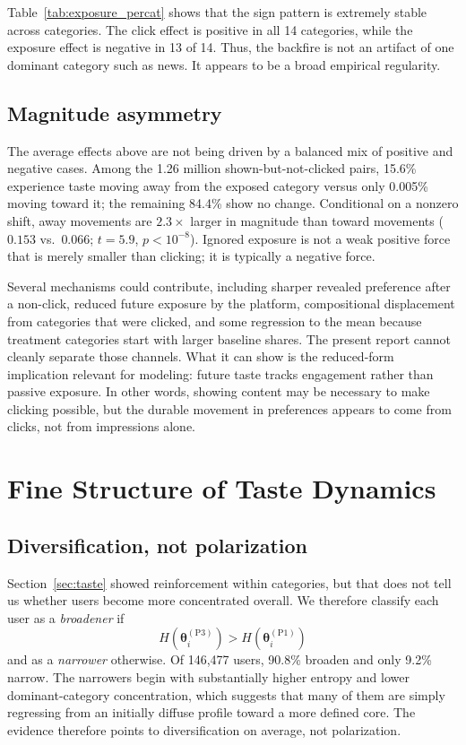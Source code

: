 \documentclass[11pt]{article}
\begin{document}
Table~\ref{tab:exposure_percat} shows that the sign pattern is extremely stable across categories. The click effect is positive in all 14 categories, while the exposure effect is negative in 13 of 14. Thus, the backfire is not an artifact of one dominant category such as news. It appears to be a broad empirical regularity.
\subsection{Magnitude asymmetry}

The average effects above are not being driven by a balanced mix of positive and negative cases. Among the 1.26 million shown-but-not-clicked pairs, 15.6\% experience taste moving away from the exposed category versus only 0.005\% moving toward it; the remaining 84.4\% show no change. Conditional on a nonzero shift, away movements are $2.3\times$ larger in magnitude than toward movements ($0.153$ vs.\ $0.066$; $t = 5.9$, $p < 10^{-8}$). Ignored exposure is not a weak positive force that is merely smaller than clicking; it is typically a negative force.

Several mechanisms could contribute, including sharper revealed preference after a non-click, reduced future exposure by the platform, compositional displacement from categories that were clicked, and some regression to the mean because treatment categories start with larger baseline shares. The present report cannot cleanly separate those channels. What it can show is the reduced-form implication relevant for modeling: future taste tracks engagement rather than passive exposure. In other words, showing content may be necessary to make clicking possible, but the durable movement in preferences appears to come from clicks, not from impressions alone.

\section{Fine Structure of Taste Dynamics}
\label{sec:fine}

\subsection{Diversification, not polarization}

Section~\ref{sec:taste} showed reinforcement within categories, but that does not tell us whether users become more concentrated overall. We therefore classify each user as a \emph{broadener} if
\[
H\!\left(\boldsymbol{\theta}_i^{(\mathrm{P3})}\right) > H\!\left(\boldsymbol{\theta}_i^{(\mathrm{P1})}\right)
\]
and as a \emph{narrower} otherwise. Of 146,477 users, 90.8\% broaden and only 9.2\% narrow. The narrowers begin with substantially higher entropy and lower dominant-category concentration, which suggests that many of them are simply regressing from an initially diffuse profile toward a more defined core. The evidence therefore points to diversification on average, not polarization.
\end{document}

